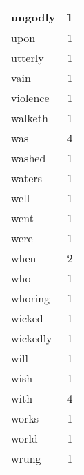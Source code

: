 \begin{center}
\begin{longtable}{l|r}
ungodly & 1 \\ \hline
upon & 1 \\ \hline
utterly & 1 \\ \hline
vain & 1 \\ \hline
violence & 1 \\ \hline
walketh & 1 \\ \hline
was & 4 \\ \hline
washed & 1 \\ \hline
waters & 1 \\ \hline
well & 1 \\ \hline
went & 1 \\ \hline
were & 1 \\ \hline
when & 2 \\ \hline
who & 1 \\ \hline
whoring & 1 \\ \hline
wicked & 1 \\ \hline
wickedly & 1 \\ \hline
will & 1 \\ \hline
wish & 1 \\ \hline
with & 4 \\ \hline
works & 1 \\ \hline
world & 1 \\ \hline
wrung & 1 \\ \hline
\end{longtable}
\end{center}



\normalsize



